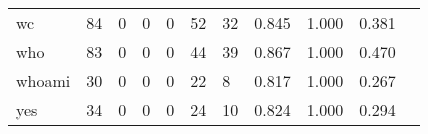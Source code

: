 \begin{longtable}{lp{1.2cm}p{1.2cm}p{1.2cm}p{1.2cm}p{1.2cm}p{1.2cm}p{1.2cm}p{1.2cm}p{1.2cm}p{1.2cm}}
wc        &                                    84 &                                                  0 &                                                  0 &                                                  0 &                                                 52 &                                                 32 &                                              0.845 &                                              1.000 &                                              0.381 \\
who       &                                    83 &                                                  0 &                                                  0 &                                                  0 &                                                 44 &                                                 39 &                                              0.867 &                                              1.000 &                                              0.470 \\
whoami    &                                    30 &                                                  0 &                                                  0 &                                                  0 &                                                 22 &                                                  8 &                                              0.817 &                                              1.000 &                                              0.267 \\
yes       &                                    34 &                                                  0 &                                                  0 &                                                  0 &                                                 24 &                                                 10 &                                              0.824 &                                              1.000 &                                              0.294 \\
\end{longtable}
